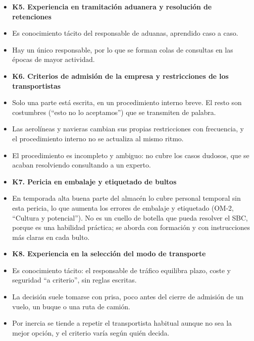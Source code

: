 \documentclass[12pt,a4paper,twoside,spanish]{article}      %
\begin{document}
{\begin{itemize}
    \item[] \textbf{K5. Experiencia en tramitación aduanera y resolución de retenciones}
    \item[(13)] Es conocimiento tácito del responsable de aduanas, aprendido caso a caso.
    \item[(14)] Hay un único responsable, por lo que se forman colas de consultas en las épocas de mayor actividad.

    \item[] \textbf{K6. Criterios de admisión de la empresa y restricciones de los transportistas}
    \item[(15)] Solo una parte está escrita, en un procedimiento interno breve. El resto son costumbres (``esto no lo aceptamos'') que se transmiten de palabra.
    \item[(16)] Las aerolíneas y navieras cambian sus propias restricciones con frecuencia, y el procedimiento interno no se actualiza al mismo ritmo.
    \item[(17)] El procedimiento es incompleto y ambiguo: no cubre los casos dudosos, que se acaban resolviendo consultando a un experto.

    \item[] \textbf{K7. Pericia en embalaje y etiquetado de bultos}
    \item[(18)] En temporada alta buena parte del almacén lo cubre personal temporal sin esta pericia, lo que aumenta los errores de embalaje y etiquetado (OM-2, ``Cultura y potencial''). No es un cuello de botella que pueda resolver el SBC, porque es una habilidad práctica; se aborda con formación y con instrucciones más claras en cada bulto.

    \item[] \textbf{K8. Experiencia en la selección del modo de transporte}
    \item[(19)] Es conocimiento tácito: el responsable de tráfico equilibra plazo, coste y seguridad ``a criterio'', sin reglas escritas.
    \item[(20)] La decisión suele tomarse con prisa, poco antes del cierre de admisión de un vuelo, un buque o una ruta de camión.
    \item[(21)] Por inercia se tiende a repetir el transportista habitual aunque no sea la mejor opción, y el criterio varía según quién decida.


\end{itemize}}
\end{document}
